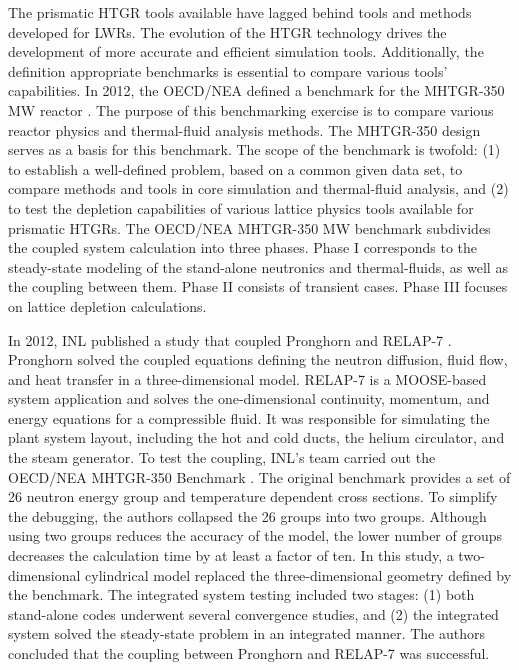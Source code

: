 The prismatic HTGR tools available have lagged behind tools and methods developed for \glspl{LWR}.
The evolution of the HTGR technology drives the development of more accurate and efficient simulation tools.
Additionally, the definition appropriate benchmarks is essential to compare various tools' capabilities.
In 2012, the \gls{OECD}/\gls{NEA} defined a benchmark for the \gls{MHTGR}-350 MW reactor \cite{oecd_nea_benchmark_2017}.
The purpose of this benchmarking exercise is to compare various reactor physics and thermal-fluid analysis methods.
The MHTGR-350 design serves as a basis for this benchmark.
The scope of the benchmark is twofold: (1) to establish a well-defined problem, based on a common given data set, to compare methods and tools in core simulation and thermal-fluid analysis, and (2) to test the depletion capabilities of various lattice physics tools available for prismatic \glspl{HTGR}.
The OECD/NEA MHTGR-350 MW benchmark subdivides the coupled system calculation into three phases.
Phase I corresponds to the steady-state modeling of the stand-alone neutronics and thermal-fluids, as well as the coupling between them.
Phase II consists of transient cases.
Phase III focuses on lattice depletion calculations.

In 2012, \gls{INL} published a study \cite{j_ortensi_initial_2012} that coupled Pronghorn and RELAP-7 \cite{andrs_relap-7_2012}.
Pronghorn solved the coupled equations defining the neutron diffusion, fluid flow, and heat transfer in a three-dimensional model.
RELAP-7 is a MOOSE-based system application and solves the one-dimensional continuity, momentum, and energy equations for a compressible fluid.
It was responsible for simulating the plant system layout, including the hot and cold ducts, the helium circulator, and the steam generator.
To test the coupling, INL's team carried out the OECD/NEA MHTGR-350 Benchmark \cite{oecd_nea_coupled_2020}.
The original benchmark provides a set of 26 neutron energy group and temperature dependent cross sections.
To simplify the debugging, the authors collapsed the 26 groups into two groups.
Although using two groups reduces the accuracy of the model, the lower number of groups decreases the calculation time by at least a factor of ten.
In this study, a two-dimensional cylindrical model replaced the three-dimensional geometry defined by the benchmark.
The integrated system testing included two stages: (1) both stand-alone codes underwent several convergence studies, and (2) the integrated system solved the steady-state problem in an integrated manner.
The authors concluded that the coupling between Pronghorn and RELAP-7 was successful.

